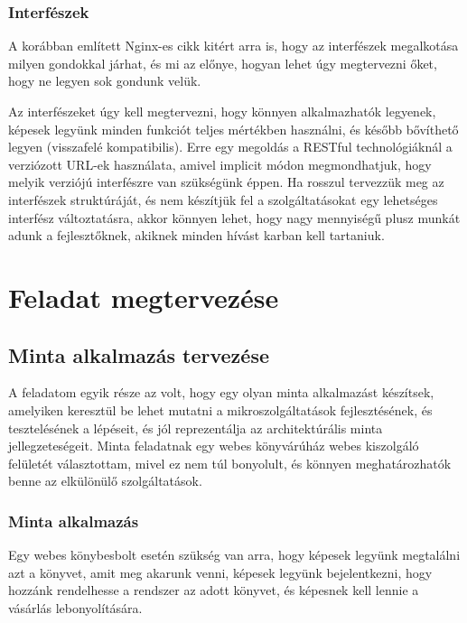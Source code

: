 \documentclass[11pt,magyar,a4paper,twoside,]{report}
\begin{document}
\subsection{Interfészek}\label{interfuxe9szek}

A korábban említett Nginx-es cikk kitért arra is, hogy az interfészek
megalkotása milyen gondokkal járhat, és mi az előnye, hogyan lehet úgy
megtervezni őket, hogy ne legyen sok gondunk velük.

Az interfészeket úgy kell megtervezni, hogy könnyen alkalmazhatók
legyenek, képesek legyünk minden funkciót teljes mértékben használni, és
később bővíthető legyen (visszafelé kompatibilis). Erre egy megoldás a
RESTful technológiáknál a verziózott URL-ek használata, amivel implicit
módon megmondhatjuk, hogy melyik verziójú interfészre van szükségünk
éppen. Ha rosszul tervezzük meg az interfészek struktúráját, és nem
készítjük fel a szolgáltatásokat egy lehetséges interfész változtatásra,
akkor könnyen lehet, hogy nagy mennyiségű plusz munkát adunk a
fejlesztőknek, akiknek minden hívást karban kell tartaniuk.

\chapter{Feladat megtervezése}\label{feladat-megtervezuxe9se}

\section{Minta alkalmazás
tervezése}\label{minta-alkalmazuxe1s-tervezuxe9se}

A feladatom egyik része az volt, hogy egy olyan minta alkalmazást
készítsek, amelyiken keresztül be lehet mutatni a mikroszolgáltatások
fejlesztésének, és tesztelésének a lépéseit, és jól reprezentálja az
architektúrális minta jellegzeteségeit. Minta feladatnak egy webes
könyvárúház webes kiszolgáló felületét választottam, mivel ez nem túl
bonyolult, és könnyen meghatározhatók benne az elkülönülő
szolgáltatások.

\subsection{Minta alkalmazás}\label{minta-alkalmazuxe1s}

Egy webes könybesbolt esetén szükség van arra, hogy képesek legyünk
megtalálni azt a könyvet, amit meg akarunk venni, képesek legyünk
bejelentkezni, hogy hozzánk rendelhesse a rendszer az adott könyvet, és
képesnek kell lennie a vásárlás lebonyolítására.
\end{document}
